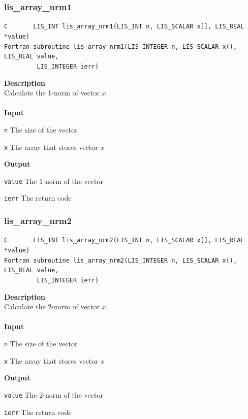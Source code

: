 \documentclass[a4paper]{article}
\newcommand{\namelistlabel}[1]{\mbox{#1}\hfill}
\newenvironment{namelist}[1]{%
\begin{list}{}
  {\let\makelabel\namelistlabel
  \settowidth{\labelwidth}{#1}
  \setlength{\leftmargin}{1.1\labelwidth}}
  }{%
\end{list}}
\begin{document}
\subsubsection{lis\_array\_nrm1}
\begin{screen}
\verb|C       LIS_INT lis_array_nrm1(LIS_INT n, LIS_SCALAR x[], LIS_REAL *value)|\\
\verb|Fortran subroutine lis_array_nrm1(LIS_INTEGER n, LIS_SCALAR x(), LIS_REAL value,|\\
\verb|         LIS_INTEGER ierr)|
\end{screen}
{\bf Description}\\
\indent
Calculate the 1-norm of vector $x$.
\\ \\
\noindent
{\bf Input}
\begin{namelist}{XXXXXXXXXXXXXXXXXXXX}
\item[\tt n] The size of the vector
\item[\tt x] The array that stores vector $x$
\end{namelist}
{\bf Output}
\begin{namelist}{XXXXXXXXXXXXXXXXXXXX}
\item[\tt value] The 1-norm of the vector
\item[\tt ierr] The return code
\end{namelist}

\newpage
\subsubsection{lis\_array\_nrm2}
\begin{screen}
\verb|C       LIS_INT lis_array_nrm2(LIS_INT n, LIS_SCALAR x[], LIS_REAL *value)|\\
\verb|Fortran subroutine lis_array_nrm2(LIS_INTEGER n, LIS_SCALAR x(), LIS_REAL value,|\\
\verb|         LIS_INTEGER ierr)|
\end{screen}
{\bf Description}\\
\indent
Calculate the 2-norm of vector $x$.
\\ \\
\noindent
{\bf Input}
\begin{namelist}{XXXXXXXXXXXXXXXXXXXX}
\item[\tt n] The size of the vector
\item[\tt x] The array that stores vector $x$
\end{namelist}
{\bf Output}
\begin{namelist}{XXXXXXXXXXXXXXXXXXXX}
\item[\tt value] The 2-norm of the vector
\item[\tt ierr] The return code
\end{namelist}
\end{document}
